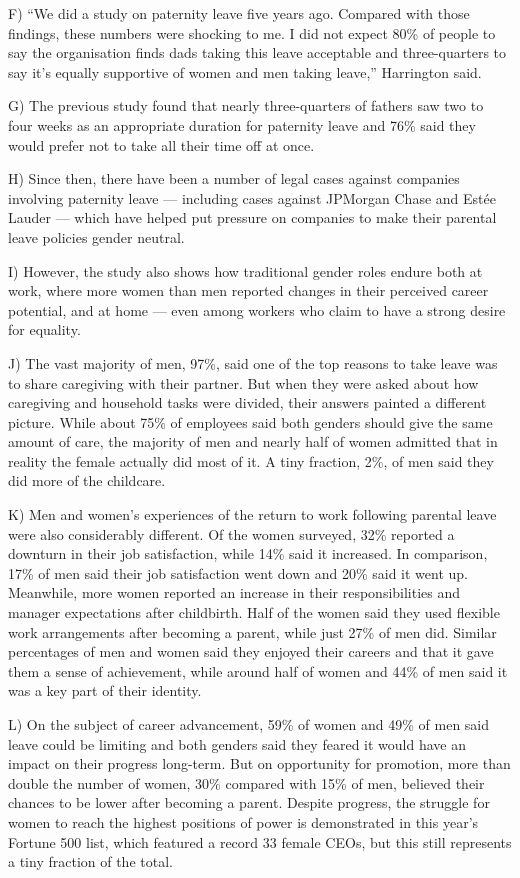 \documentclass[UTF8,11pt]{ctexart}
\begin{document}
F) “We did a study on paternity leave five years ago. Compared with those findings, these numbers were shocking to me. I did not expect 80\% of people to say the organisation finds dads taking this leave acceptable and three-quarters to say it’s equally supportive of women and men taking leave,” Harrington said.


G) The previous study found that nearly three-quarters of fathers saw two to four weeks as an appropriate duration for paternity leave and 76\% said they would prefer not to take all their time off at once.


H) Since then, there have been a number of legal cases against companies involving paternity leave — including cases against JPMorgan Chase and Estée Lauder — which have helped put pressure on companies to make their parental leave policies gender neutral.


I) However, the study also shows how traditional gender roles endure both at work, where more women than men reported changes in their perceived career potential, and at home — even among workers who claim to have a strong desire for equality.


J) The vast majority of men, 97\%, said one of the top reasons to take leave was to share caregiving with their partner. But when they were asked about how caregiving and household tasks were divided, their answers painted a different picture. While about 75\% of employees said both genders should give the same amount of care, the majority of men and nearly half of women admitted that in reality the female actually did most of it. A tiny fraction, 2\%, of men said they did more of the childcare.


K) Men and women’s experiences of the return to work following parental leave were also considerably different. Of the women surveyed, 32\% reported a downturn in their job satisfaction, while 14\% said it increased. In comparison, 17\% of men said their job satisfaction went down and 20\% said it went up. Meanwhile, more women reported an increase in their responsibilities and manager expectations after childbirth. Half of the women said they used flexible work arrangements after becoming a parent, while just 27\% of men did. Similar percentages of men and women said they enjoyed their careers and that it gave them a sense of achievement, while around half of women and 44\% of men said it was a key part of their identity.


L) On the subject of career advancement, 59\% of women and 49\% of men said leave could be limiting and both genders said they feared it would have an impact on their progress long-term. But on opportunity for promotion, more than double the number of women, 30\% compared with 15\% of men, believed their chances to be lower after becoming a parent. Despite progress, the struggle for women to reach the highest positions of power is demonstrated in this year’s Fortune 500 list, which featured a record 33 female CEOs, but this still represents a tiny fraction of the total.
\end{document}
